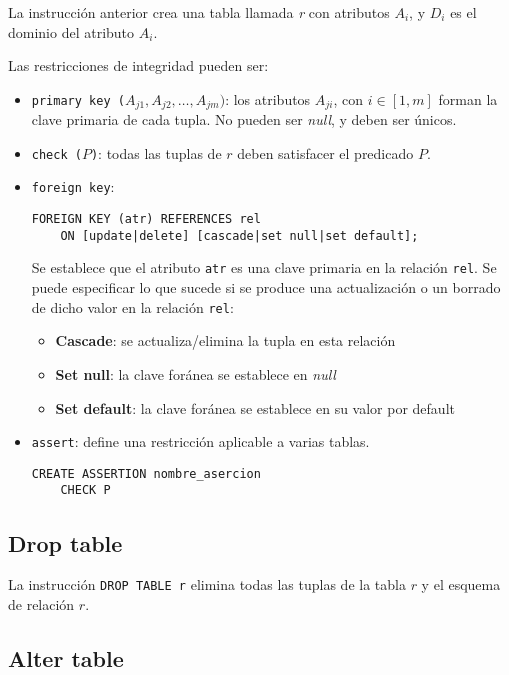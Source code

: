 \documentclass[a4paper, twoside]{article}
\begin{document}
La instrucción anterior crea una tabla llamada \emph{r} con atributos
$A_{i}$, y $D_{i}$ es el dominio del atributo $A_{i}$.

Las restricciones de integridad pueden ser:
\begin{itemize}
\item \texttt{primary key ($A_{j1},A_{j2},\dots,A_{jm})$}: los atributos
$A_{ji}$, con $i\in[1,m]$ forman la clave primaria de cada tupla.
No pueden ser \emph{null}, y deben ser únicos.
\item \texttt{check ($P$)}: todas las tuplas de $r$ deben satisfacer el
predicado $P$.
\item \texttt{foreign key}:\texttt{}
\begin{lstlisting}
FOREIGN KEY (atr) REFERENCES rel
	ON [update|delete] [cascade|set null|set default];
\end{lstlisting}



Se establece que el atributo \texttt{atr} es una clave primaria en
la relación \texttt{rel}. Se puede especificar lo que sucede si se
produce una actualización o un borrado de dicho valor en la relación
\texttt{rel}:
\begin{itemize}
\item \textbf{Cascade}: se actualiza/elimina la tupla en esta relación
\item \textbf{Set null}: la clave foránea se establece en \emph{null}
\item \textbf{Set default}: la clave foránea se establece en su valor por
default
\end{itemize}
\item \texttt{assert}: define una restricción aplicable a varias tablas.


\begin{lstlisting}
CREATE ASSERTION nombre_asercion
	CHECK P
\end{lstlisting}


\end{itemize}

\subsection{Drop table}

La instrucción \texttt{DROP TABLE r} elimina todas las tuplas de la
tabla $r$ y el esquema de relación $r$.


\subsection{Alter table}
\end{document}
